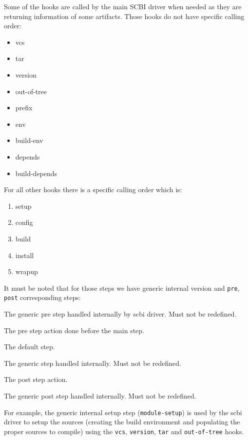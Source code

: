 \documentclass[a4paper,12pt,twoside]{article}
\newcommand{\code}[1]{\texttt{#1}}
\begin{document}
Some of the hooks are called by the main SCBI driver when needed as they are returning information of some artifacts. Those hooks do not have specific calling order:

\begin{itemize}
	\item vcs
	\item tar
	\item version
	\item out-of-tree
	\item prefix
	\item env
	\item build-env
	\item depends
	\item build-depends
\end{itemize}

For all other hooks there is a specific calling order which is:

\begin{enumerate}
	\item setup
	\item config
	\item build
	\item install
	\item wrapup
\end{enumerate}

It must be noted that for those steps we have generic internal version and \code{pre}, \code{post} corresponding steps:

\begin{description}[font=\texttt,style=nextline]
	\item[module-pre-<step>] The generic pre step handled internally by scbi driver. Must not be redefined.
	\item[<module>-pre-<step>] The pre step action done before the main step.
	\item[<module>-<step>] The default step.
	\item[module-<step>] The generic step handled internally. Must not be redefined.
	\item[<module>-post-<step>] The post step action.
	\item[module-post-<step>] The generic post step handled internally. Must not be redefined.
\end{description}

For example, the generic internal setup step (\code{module-setup}) is used by the scbi driver to setup the sources (creating the build environment and populating the proper sources to compile) using the \code{vcs}, \code{version}, \code{tar} and \code{out-of-tree} hooks.
\end{document}
